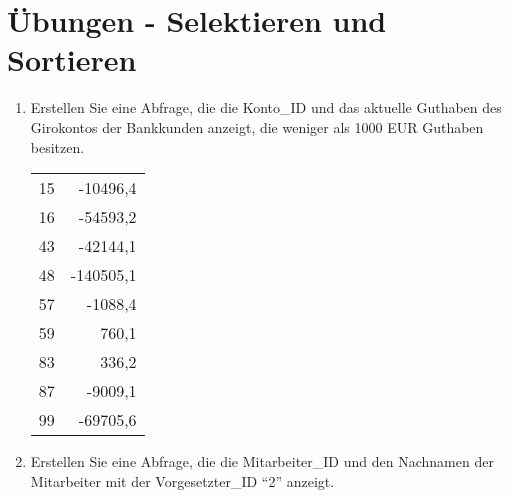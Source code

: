 \clearpage
    \section{\"Ubungen - Selektieren und Sortieren}
      \begin{enumerate}
        \item Erstellen Sie eine Abfrage, die die Konto\_ID und das aktuelle
        Guthaben des Girokontos der Bankkunden anzeigt, die weniger als 1000 EUR
        Guthaben besitzen.
        \begin{center}
          \begin{small}
            \tablehead{}
            \begin{msoraclesql}
              \begin{supertabular}{rr}
                15 & -10496,4 \\
                16 & -54593,2 \\
                43 & -42144,1 \\
                48 & -140505,1 \\
                57 & -1088,4 \\
                59 & 760,1 \\
                83 & 336,2 \\
                87 & -9009,1 \\
                99 & -69705,6 \\
              \end{supertabular}
            \end{msoraclesql}
          \end{small}
        \end{center}
        \item Erstellen Sie eine Abfrage, die die Mitarbeiter\_ID und den
        Nachnamen der Mitarbeiter mit der Vorgesetzter\_ID \enquote{2} anzeigt.
        \begin{center}
          \begin{small}

\end{small}
\end{center}
\end{enumerate}
